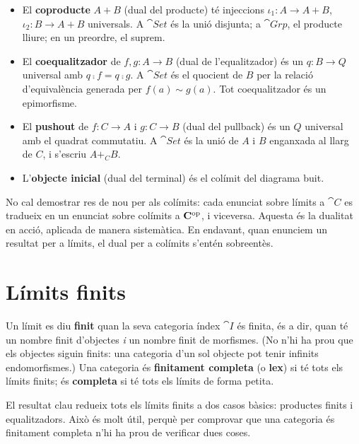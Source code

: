 \begin{itemize}
\item El \textbf{coproducte} $A+B$ (dual del producte) té injeccions $\iota_1\colon A\to A+B$, $\iota_2\colon B\to A+B$ universals. A $\cat{Set}$ és la unió disjunta; a $\cat{Grp}$, el producte lliure; en un preordre, el suprem.
\item El \textbf{coequalitzador} de $f,g\colon A\to B$ (dual de l'equalitzador) és un $q\colon B\to Q$ universal amb $q\comp f=q\comp g$. A $\cat{Set}$ és el quocient de $B$ per la relació d'equivalència generada per $f(a)\sim g(a)$. Tot coequalitzador és un epimorfisme.
\item El \textbf{pushout} de $f\colon C\to A$ i $g\colon C\to B$ (dual del pullback) és un $Q$ universal amb el quadrat commutatiu. A $\cat{Set}$ és la unió de $A$ i $B$ enganxada al llarg de $C$, i s'escriu $A+_C B$.
\item L'\textbf{objecte inicial} (dual del terminal) és el colímit del diagrama buit.
\end{itemize}

\begin{observacio}
No cal demostrar res de nou per als colímits: cada enunciat sobre límits a $\cat{C}$ es tradueix en un enunciat sobre colímits a $\mathbf{C}^{\mathrm{op}}$, i viceversa. Aquesta és la dualitat en acció, aplicada de manera sistemàtica. En endavant, quan enunciem un resultat per a límits, el dual per a colímits s'entén sobreentès.
\end{observacio}

\section{Límits finits}

\begin{definicio}
Un límit es diu \textbf{finit} quan la seva categoria índex $\cat{I}$ és finita, és a dir, quan té un nombre finit d'objectes \emph{i} un nombre finit de morfismes. (No n'hi ha prou que els objectes siguin finits: una categoria d'un sol objecte pot tenir infinits endomorfismes.) Una categoria és \textbf{finitament completa} (o \textbf{lex}) si té tots els límits finits; és \textbf{completa} si té tots els límits de forma petita.
\end{definicio}

El resultat clau redueix tots els límits finits a dos casos bàsics: productes finits i equalitzadors. Això és molt útil, perquè per comprovar que una categoria és finitament completa n'hi ha prou de verificar dues coses.

